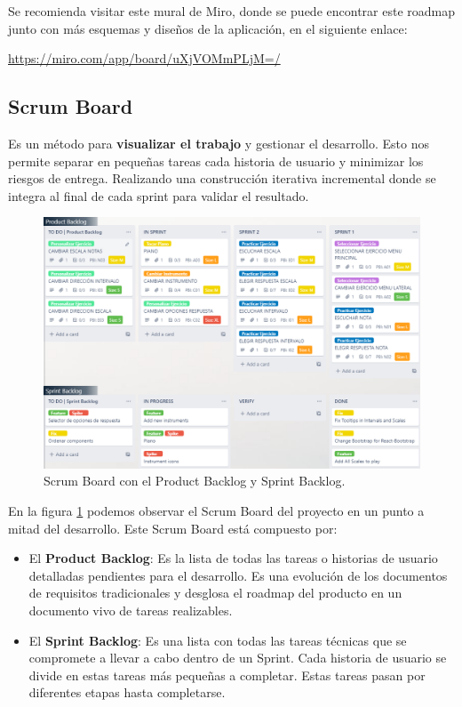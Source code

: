 \documentclass[12pt,twoside,titlepage]{report}
\begin{document}
Se recomienda visitar este mural de Miro, donde se puede encontrar este roadmap junto con más esquemas y diseños de la aplicación, en el siguiente enlace: 

\href{https://miro.com/app/board/uXjVOMmPLjM=/?share_link_id=588058562303}{https://miro.com/app/board/uXjVOMmPLjM=/}

\subsection{Scrum Board}

Es un método para \textbf{visualizar el trabajo} y gestionar el desarrollo. Esto nos permite separar en pequeñas tareas cada historia de usuario y minimizar los riesgos de entrega. Realizando una construcción iterativa incremental donde se integra al final de cada sprint para validar el resultado. 
\cite{scrumboard1}
\cite{scrumboard2}

\begin{figure}[H]
    \centering
    \includegraphics[scale=0.47]{Scrum/ScrumBoard}
    \caption{Scrum Board con el Product Backlog y Sprint Backlog.}
    \label{fig:ScrumBoard}
\end{figure}

En la figura \ref{fig:ScrumBoard} podemos observar el Scrum Board del proyecto en un punto a mitad del desarrollo. Este Scrum Board está compuesto por:
\begin{itemize}
    \item El \textbf{Product Backlog}: Es la lista de todas las tareas o historias de usuario detalladas pendientes para el desarrollo. Es una evolución de los documentos de requisitos tradicionales y desglosa el roadmap del producto en un documento vivo de tareas realizables.
    \item El \textbf{Sprint Backlog}: Es una lista con todas las tareas técnicas que se compromete a llevar a cabo dentro de un Sprint. Cada historia de usuario se divide en estas tareas más pequeñas a completar. Estas tareas pasan por diferentes etapas hasta completarse.
\end{itemize}
\end{document}
